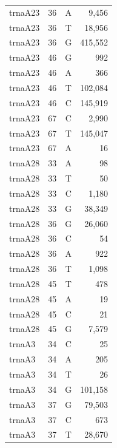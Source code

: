 \documentclass[12pt]{rockefeller}
\begin{document}
\begin{tiny}
\begin{longtable}{|l|r|c|r|}
 trnaA23 &        36 &          A &      9,456 \\
 trnaA23 &        36 &          T &     18,956 \\
 trnaA23 &        36 &          G &    415,552 \\
 trnaA23 &        46 &          G &        992 \\
 trnaA23 &        46 &          A &        366 \\
 trnaA23 &        46 &          T &    102,084 \\
 trnaA23 &        46 &          C &    145,919 \\
 trnaA23 &        67 &          C &      2,990 \\
 trnaA23 &        67 &          T &    145,047 \\
 trnaA23 &        67 &          A &         16 \\
 trnaA28 &        33 &          A &         98 \\
 trnaA28 &        33 &          T &         50 \\
 trnaA28 &        33 &          C &      1,180 \\
 trnaA28 &        33 &          G &     38,349 \\
 trnaA28 &        36 &          G &     26,060 \\
 trnaA28 &        36 &          C &         54 \\
 trnaA28 &        36 &          A &        922 \\
 trnaA28 &        36 &          T &      1,098 \\
 trnaA28 &        45 &          T &        478 \\
 trnaA28 &        45 &          A &         19 \\
 trnaA28 &        45 &          C &         21 \\
 trnaA28 &        45 &          G &      7,579 \\
  trnaA3 &        34 &          C &         25 \\
  trnaA3 &        34 &          A &        205 \\
  trnaA3 &        34 &          T &         26 \\
  trnaA3 &        34 &          G &    101,158 \\
  trnaA3 &        37 &          G &     79,503 \\
  trnaA3 &        37 &          C &        673 \\
  trnaA3 &        37 &          T &     28,670 \\

\end{longtable}
\end{tiny}
\end{document}
